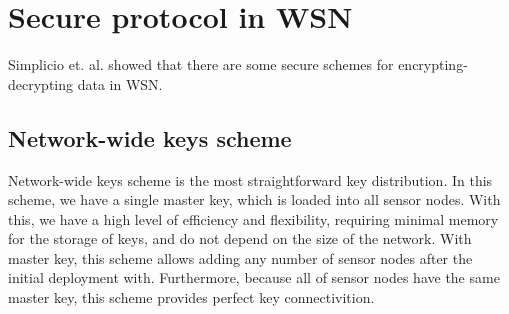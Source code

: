 \section{Secure protocol in WSN}

Simplicio et. al. \cite{Simplicio:2010:SKM:1862461.1862545} showed that there are some secure schemes for encrypting-decrypting data in WSN. 

\subsection{Network-wide keys scheme}

Network-wide keys scheme is the most straightforward key distribution. In this scheme, we have a single master key, which is loaded into all sensor nodes. With this, we have a high level of efficiency and flexibility, requiring minimal memory for the storage of keys, and do not depend on the size of the network. With master key, this scheme allows adding any number of sensor nodes after the initial deployment with. Furthermore, because all of sensor nodes have the same master key, this scheme provides perfect key connectivition. 

